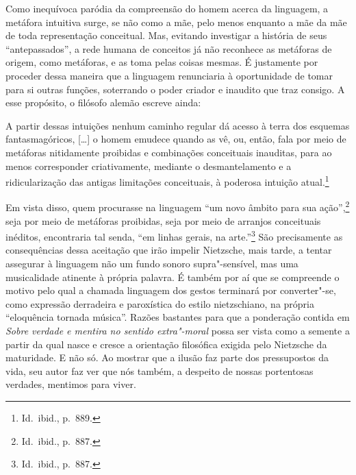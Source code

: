 Como inequívoca paródia da compreensão do homem acerca da linguagem, a
metáfora intuitiva surge, se não como a mãe, pelo menos enquanto a mãe
da mãe de toda representação conceitual. Mas, evitando investigar a
história de seus “antepassados”, a rede humana de conceitos já não
reconhece as metáforas de origem, como metáforas, e as toma pelas
coisas mesmas. É justamente por proceder dessa maneira que a linguagem
renunciaria à oportunidade de tomar para si outras funções, soterrando
o poder criador e inaudito que traz consigo. A esse propósito, o
filósofo alemão escreve ainda: 
\begin{hedraquote}
A partir dessas intuições nenhum
caminho regular dá acesso à terra dos esquemas fantasmagóricos, [\ldots{}]
o homem emudece quando as vê, ou, então, fala por meio 
de metáforas nitidamente proibidas e combinações conceituais inauditas,
para ao menos corresponder criativamente, mediante o desmantelamento e
a ridicularização das antigas limitações conceituais, à poderosa
intuição atual.\footnote{ Id.~ibid., p.~889.}
\end{hedraquote}

Em vista disso, quem procurasse na linguagem “um novo âmbito para sua
ação'',\footnote{ Id.~ibid., p.~887.} seja por meio de
metáforas proibidas, seja por meio de arranjos conceituais inéditos,
encontraria tal senda, ``em linhas gerais, na
arte.”\footnote{ Id.~ibid., p.~887.} São precisamente as consequências
dessa aceitação que irão impelir Nietzsche, mais tarde, a tentar assegurar
à linguagem não um fundo sonoro supra"-sensível, mas uma musicalidade
atinente à própria palavra. É também por aí que se compreende o motivo
pelo qual a chamada linguagem dos gestos terminará por converter"-se,
como expressão derradeira e paroxística do estilo nietzschiano, na
própria “eloquência tornada música”. Razões bastantes para que a
ponderação contida em \textit{Sobre verdade e mentira no sentido
extra"-moral } possa ser vista como a semente a partir da qual nasce e
cresce a orientação filosófica exigida pelo Nietzsche da maturidade. E
não só. Ao mostrar que a ilusão faz parte dos pressupostos da vida, seu
autor faz ver que nós também, a despeito de nossas portentosas
verdades, mentimos para viver.
